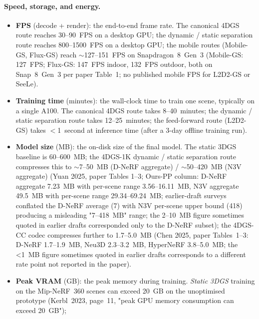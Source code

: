 \paragraph{Speed, storage, and energy.}
\begin{itemize}
  \item \textbf{FPS} (decode + render): the end-to-end frame
        rate. The canonical 4DGS route reaches 30--90~FPS
        on a desktop GPU; the dynamic / static separation
        route reaches 800--1500~FPS on a desktop GPU; the
        mobile routes (Mobile-GS, Flux-GS) reach
        $\sim$127--151~FPS on Snapdragon~8~Gen~3
        (Mobile-GS: 127~FPS; Flux-GS: 147~FPS indoor,
        132~FPS outdoor, both on Snap~8~Gen~3 per paper
        Table~1; no published mobile FPS for L2D2-GS or
        SeeLe).
  \item \textbf{Training time} (minutes): the wall-clock
        time to train one scene, typically on a single
        A100. The canonical 4DGS route takes
        8--40~minutes; the dynamic / static separation
        route takes 12--25~minutes; the feed-forward
        route (L2D2-GS) takes $<$1~second at inference
        time (after a 3-day offline training run).
  \item \textbf{Model size} (MB): the on-disk size of the
        final model. The static 3DGS baseline is
        60--600~MB; the 4DGS-1K dynamic / static
        separation route compresses this to
        $\sim$7--50~MB (D-NeRF aggregate) / $\sim$50--420~MB
        (N3V aggregate) (Yuan 2025, paper Tables 1--3;
        Ours-PP column: D-NeRF aggregate 7.23~MB with
        per-scene range 3.56--16.11~MB, N3V aggregate 49.5~MB
        with per-scene range 29.34--69.24~MB; earlier-draft
        surveys conflated the D-NeRF average (7) with
        N3V per-scene upper bound (418) producing a
        misleading "7--418~MB" range; the
        2--10~MB figure sometimes quoted in earlier drafts
        corresponded only to the D-NeRF subset); the
        4DGS-CC codec compresses further to 1.7--5.0~MB
        (Chen 2025, paper Tables~1--3: D-NeRF 1.7--1.9~MB,
        Neu3D 2.3--3.2~MB, HyperNeRF 3.8--5.0~MB; the
        <1~MB figure sometimes quoted in earlier drafts
        corresponds to a different rate point not reported
        in the paper).
  \item \textbf{Peak VRAM} (GB): the peak memory during
        training. \emph{Static 3DGS} training on the
        Mip-NeRF~360 scenes can exceed 20~GB on the
        unoptimised prototype (Kerbl~2023, page~11,
        "peak GPU memory consumption can exceed 20~GB");

\end{itemize}
